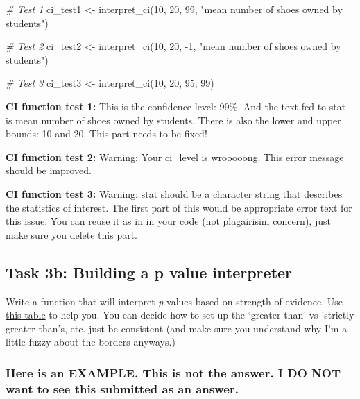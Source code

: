 \documentclass[
  openany]{book}
\newenvironment{Shaded}{\begin{snugshade}}{\end{snugshade}}
\newcommand{\CommentTok}[1]{\textcolor[rgb]{0.56,0.35,0.01}{\textit{#1}}}
\newcommand{\DecValTok}[1]{\textcolor[rgb]{0.00,0.00,0.81}{#1}}
\newcommand{\FunctionTok}[1]{\textcolor[rgb]{0.00,0.00,0.00}{#1}}
\newcommand{\NormalTok}[1]{#1}
\newcommand{\OtherTok}[1]{\textcolor[rgb]{0.56,0.35,0.01}{#1}}
\newcommand{\SpecialCharTok}[1]{\textcolor[rgb]{0.00,0.00,0.00}{#1}}
\newcommand{\StringTok}[1]{\textcolor[rgb]{0.31,0.60,0.02}{#1}}
\begin{document}
\begin{Shaded}
\begin{Highlighting}[]
\CommentTok{\# Test 1}
\NormalTok{ci\_test1 }\OtherTok{\textless{}{-}} \FunctionTok{interpret\_ci}\NormalTok{(}\DecValTok{10}\NormalTok{, }\DecValTok{20}\NormalTok{, }\DecValTok{99}\NormalTok{, }\StringTok{"mean number of shoes owned by students"}\NormalTok{)}

\CommentTok{\# Test 2}
\NormalTok{ci\_test2 }\OtherTok{\textless{}{-}} \FunctionTok{interpret\_ci}\NormalTok{(}\DecValTok{10}\NormalTok{, }\DecValTok{20}\NormalTok{, }\SpecialCharTok{{-}}\DecValTok{1}\NormalTok{, }\StringTok{"mean number of shoes owned by students"}\NormalTok{)}

\CommentTok{\# Test 3}
\NormalTok{ci\_test3 }\OtherTok{\textless{}{-}} \FunctionTok{interpret\_ci}\NormalTok{(}\DecValTok{10}\NormalTok{, }\DecValTok{20}\NormalTok{, }\DecValTok{95}\NormalTok{, }\DecValTok{99}\NormalTok{)}
\end{Highlighting}
\end{Shaded}

\textbf{CI function test 1:} This is the confidence level: 99\%. And the text fed to stat is mean number of shoes owned by students. There is also the lower and upper bounds: 10 and 20. This part needs to be fixed!

\textbf{CI function test 2:}
Warning: Your ci\_level is wrooooong.
This error message should be improved.

\textbf{CI function test 3:}
Warning:
stat should be a character string that describes the statistics of
interest. The first part of this would be appropriate error text for this
issue. You can reuse it as in in your code (not plagairisim concern),
just make sure you delete this part.

\hypertarget{task-3b-building-a-p-value-interpreter}{%
\subsection{Task 3b: Building a p value interpreter}\label{task-3b-building-a-p-value-interpreter}}

Write a function that will interpret \emph{p} values based on strength of evidence. Use \protect\hyperlink{p-values-recap}{this table} to help you. You can decide how to set up the `greater than' vs 'strictly greater than's, etc. just be consistent (and make sure you understand why I'm a little fuzzy about the borders anyways.)

\hypertarget{here-is-an-example.-this-is-not-the-answer.-i-do-not-want-to-see-this-submitted-as-an-answer.}{%
\subsubsection{Here is an EXAMPLE. This is not the answer. I DO NOT want to see this submitted as an answer.}\label{here-is-an-example.-this-is-not-the-answer.-i-do-not-want-to-see-this-submitted-as-an-answer.}}
\end{document}

